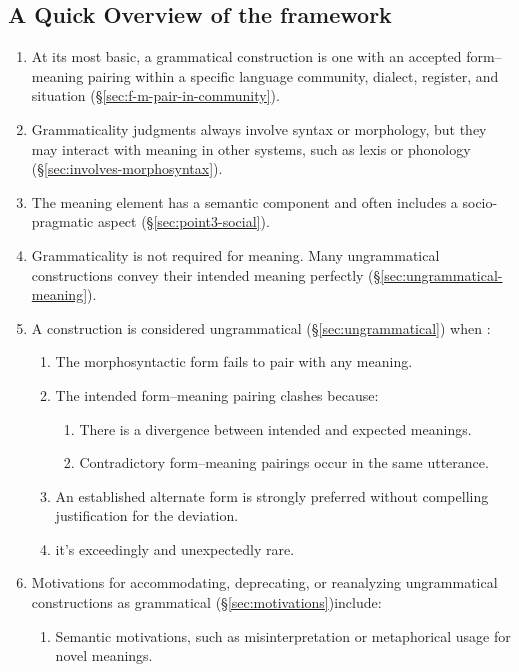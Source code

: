 \documentclass[12pt,letterpaper]{article}
\begin{document}
\subsection*{A Quick Overview of the framework}
\begin{enumerate}
    \item At its most basic, a grammatical construction is one with an accepted form--meaning pairing within a specific language community, dialect, register, and situation (\S\ref{sec:f-m-pair-in-community}).
    \item Grammaticality judgments always involve syntax or morphology, but they may interact with meaning in other systems, such as lexis or phonology (\S\ref{sec:involves-morphosyntax}). 
    \item The meaning element has a semantic component and often includes a socio-pragmatic aspect (\S\ref{sec:point3-social}).
    \item Grammaticality is not required for meaning. Many ungrammatical constructions convey their intended meaning perfectly (\S\ref{sec:ungrammatical-meaning}).
    \item A construction is considered ungrammatical (\S\ref{sec:ungrammatical}) when :
        \begin{enumerate}
            \item The morphosyntactic form fails to pair with any meaning.
            \item The intended form--meaning pairing clashes because:
                \begin{enumerate}
                    \item There is a divergence between intended and expected meanings.
                    \item Contradictory form--meaning pairings occur in the same utterance.
                \end{enumerate}
            \item An established alternate form is strongly preferred without compelling justification for the deviation.
            \item it's exceedingly and unexpectedly rare.
        \end{enumerate}
    \item Motivations for accommodating, deprecating, or reanalyzing ungrammatical constructions as grammatical (\S\ref{sec:motivations})include:
        \begin{enumerate}
            \item Semantic motivations, such as misinterpretation or metaphorical usage for novel meanings.

\end{enumerate}
\end{enumerate}
\end{document}
